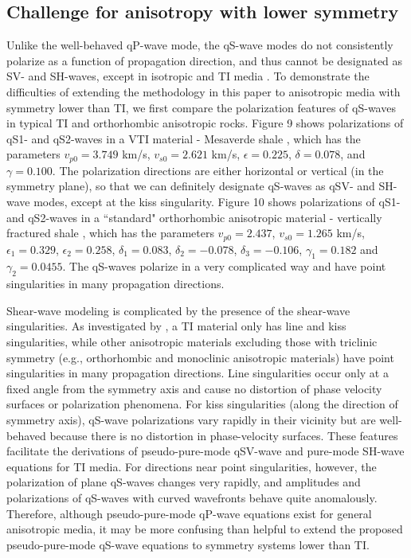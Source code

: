 \subsection{Challenge for anisotropy with lower symmetry}
Unlike the well-behaved qP-wave mode, the qS-wave modes do not consistently polarize as a function of propagation direction,
and thus cannot be designated as SV- and SH-waves, except in isotropic and TI media \cite[]{winterstein:1990}.
To demonstrate the difficulties of extending the methodology in this paper to anisotropic media with symmetry lower than TI,
we first compare the polarization features of qS-waves in typical TI and orthorhombic anisotropic rocks.
Figure 9 shows polarizations of qS1- and qS2-waves in a VTI material - Mesaverde shale \cite[]{thomsen:1986},
which has the parameters $v_{p0}=3.749$ km/s, $v_{s0}=2.621$ km/s, $\epsilon=0.225$, $\delta=0.078$, and $\gamma=0.100$.
The polarization directions are either horizontal or vertical (in the symmetry plane), 
so that we can definitely designate qS-waves as qSV- and SH-wave modes, except at the kiss singularity.
Figure 10 shows polarizations of qS1- and qS2-waves in a ``standard" orthorhombic anisotropic material - vertically fractured shale 
\cite[]{Schoenberg:1997}, which has the parameters $v_{p0}=2.437$, $v_{s0}=1.265$ km/s, $\epsilon_1=0.329$,
$\epsilon_2=0.258$, $\delta_1=0.083$, $\delta_2=-0.078$, $\delta_3=-0.106$, $\gamma_1=0.182$ and $\gamma_2=0.0455$.
The qS-waves polarize in a very complicated way and have point singularities in many propagation directions.

Shear-wave modeling is complicated by the presence of the shear-wave singularities.
As investigated by \cite{crampin.yedlin:1981},
a TI material only has line and kiss singularities, while other anisotropic materials excluding those with triclinic symmetry
(e.g., orthorhombic and monoclinic anisotropic materials) have point singularities in many propagation directions.
Line singularities occur only at a fixed angle from the symmetry axis and cause
no distortion of phase velocity surfaces or polarization phenomena.
For kiss singularities (along the direction of symmetry axis), 
qS-wave polarizations vary rapidly in their vicinity but are well-behaved because there is no distortion in phase-velocity surfaces.
These features facilitate the derivations of pseudo-pure-mode qSV-wave and pure-mode SH-wave equations for TI media.
For directions near point singularities, however, the polarization of plane qS-waves changes very rapidly,
and amplitudes and polarizations of qS-waves with curved wavefronts behave quite anomalously.
Therefore, although pseudo-pure-mode qP-wave equations exist for general anisotropic media, 
it may be more confusing than helpful to extend the proposed pseudo-pure-mode qS-wave equations
to symmetry systems lower than TI.

